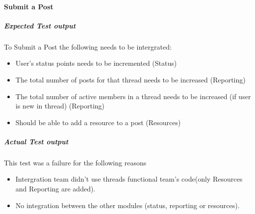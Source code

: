 \paragraph{Submit a Post}
	\subparagraph{Expected Test output}
	To Submit a Post the following needs to be intergrated:
		\begin{itemize}
			\item User's status points needs to be incremented (Status)
			\item The total number of posts for that thread needs to be increased (Reporting)
			\item The total number of active members in a thread needs to be increased (if user is new in thread) (Reporting)
			\item Should be able to add a resource to a post (Resources)
		\end{itemize}
	
	\subparagraph{Actual Test output}
	This test was a failure for the following reasons
		\begin{itemize}
			\item Intergration team didn't use threads functional team's code(only Resources and Reporting are added).
			\item No integration between the other modules (status, reporting or resources).
		\end{itemize}
